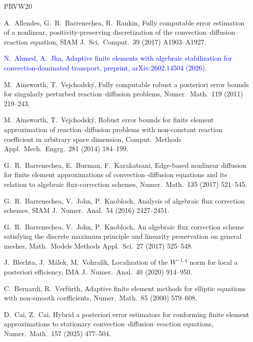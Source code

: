 \documentclass[11pt]{article}
\newcommand{\rev}[1]{\textcolor{blue}{#1}}
\theoremstyle{plain}
\theoremstyle{remark}
\numberwithin{equation}{section}
\begin{document}
\begin{thebibliography}{PRVW20}

A.~Allendes, G.~R.~Barrenechea, R.~Rankin,
Fully computable error estimation of a nonlinear, positivity-preserving discretization of the
convection--diffusion--reaction equation,
SIAM J.\ Sci.\ Comput.\ 39 (2017) A1903--A1927.

\rev{N.~Ahmed, A.~Jha,
Adaptive finite elements with algebraic stabilization for convection-dominated transport,
preprint, arXiv:2602.14504 (2026).}

M.~Ainsworth, T.~Vejchodsk\'y,
Fully computable robust a posteriori error bounds for singularly perturbed reaction--diffusion
problems,
Numer.\ Math.\ 119 (2011) 219--243.

M.~Ainsworth, T.~Vejchodsk\'y,
Robust error bounds for finite element approximation of reaction--diffusion problems with
non-constant reaction coefficient in arbitrary space dimension,
Comput.\ Methods Appl.\ Mech.\ Engrg.\ 281 (2014) 184--199.

G.~R.~Barrenechea, E.~Burman, F.~Karakatsani,
Edge-based nonlinear diffusion for finite element approximations of convection--diffusion equations
and its relation to algebraic flux-correction schemes,
Numer.\ Math.\ 135 (2017) 521--545.

G.~R.~Barrenechea, V.~John, P.~Knobloch,
Analysis of algebraic flux correction schemes,
SIAM J.\ Numer.\ Anal.\ 54 (2016) 2427--2451.

G.~R.~Barrenechea, V.~John, P.~Knobloch,
An algebraic flux correction scheme satisfying the discrete maximum principle and linearity
preservation on general meshes,
Math.\ Models Methods Appl.\ Sci.\ 27 (2017) 525--548.

J.~Blechta, J.~M\'alek, M.~Vohral\'ik,
Localization of the $W^{-1,q}$ norm for local a posteriori efficiency,
IMA J.\ Numer.\ Anal.\ 40 (2020) 914--950.

C.~Bernardi, R.~Verfürth,
Adaptive finite element methods for elliptic equations with non-smooth coefficients,
Numer.\ Math.\ 85 (2000) 579--608.

D.~Cai, Z.~Cai,
Hybrid a posteriori error estimators for conforming finite element approximations to stationary
convection--diffusion--reaction equations,
Numer.\ Math.\ 157 (2025) 477--504.


\end{thebibliography}
\end{document}
